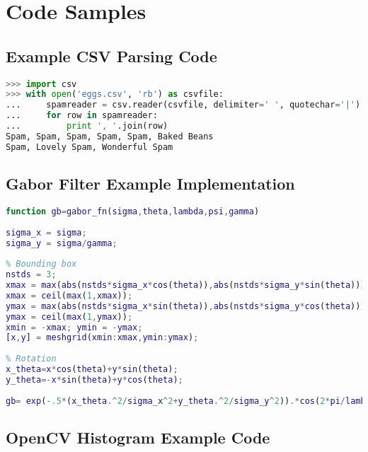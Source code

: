 \chapter{Code Samples}

\section{Example CSV Parsing Code}
\begin{lstlisting}[language=python,breaklines=true,
caption={Example CSV Parsing Code from http://docs.python.org/2/library/csv.html},label=lst:csv_example_code]
>>> import csv
>>> with open('eggs.csv', 'rb') as csvfile:
...     spamreader = csv.reader(csvfile, delimiter=' ', quotechar='|')
...     for row in spamreader:
...         print ', '.join(row)
Spam, Spam, Spam, Spam, Spam, Baked Beans
Spam, Lovely Spam, Wonderful Spam
\end{lstlisting}

\section{Gabor Filter Example Implementation}
\begin{lstlisting}[language=MATLAB,breaklines=true,
caption={Example implementation of a Gabor Filter in MATLAB from wikipedia\cite{Contributors2012Gabor}}]
function gb=gabor_fn(sigma,theta,lambda,psi,gamma)
 
sigma_x = sigma;
sigma_y = sigma/gamma;
 
% Bounding box
nstds = 3;
xmax = max(abs(nstds*sigma_x*cos(theta)),abs(nstds*sigma_y*sin(theta)));
xmax = ceil(max(1,xmax));
ymax = max(abs(nstds*sigma_x*sin(theta)),abs(nstds*sigma_y*cos(theta)));
ymax = ceil(max(1,ymax));
xmin = -xmax; ymin = -ymax;
[x,y] = meshgrid(xmin:xmax,ymin:ymax);
 
% Rotation 
x_theta=x*cos(theta)+y*sin(theta);
y_theta=-x*sin(theta)+y*cos(theta);
 
gb= exp(-.5*(x_theta.^2/sigma_x^2+y_theta.^2/sigma_y^2)).*cos(2*pi/lambda*x_theta+psi);
\end{lstlisting}


\section{OpenCV Histogram Example Code}



